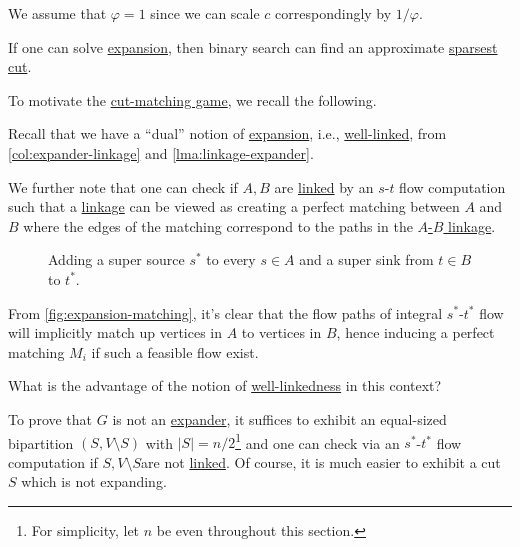 \begin{note}
	We assume that \(\varphi = 1\) since we can scale \(c\) correspondingly by \(1 / \varphi \).
\end{note}

\begin{remark}
	If one can solve \hyperref[prb:expansion]{expansion}, then binary search can find an approximate \hyperref[prb:sparsest-cut]{sparsest cut}.
\end{remark}

To motivate the \hyperref[def:cut-matching-game]{cut-matching game}, we recall the following.

\begin{prev}
	Recall that we have a ``dual'' notion of \hyperref[def:expansion]{expansion}, i.e., \hyperref[def:well-linked]{well-linked}, from \autoref{col:expander-linkage} and \autoref{lma:linkage-expander}.
\end{prev}

We further note that one can check if \(A, B\) are \hyperref[def:linkage]{linked} by an \(s\)-\(t\) flow computation such that a \hyperref[def:linkage]{linkage} can be viewed as creating a perfect matching between \(A\) and \(B\) where the edges of the matching correspond to the paths in the \hyperref[def:linkage]{\(A\)-\(B\) linkage}.

\begin{center}
	\begin{figure}[H]
		\centering
		\caption{Adding a super source \(s^{\ast} \) to every \(s \in A\) and a super sink from \(t \in B\) to \(t^{\ast} \).}
		\label{fig:expansion-matching}
	\end{figure}
\end{center}

From \autoref{fig:expansion-matching}, it's clear that the flow paths of integral \(s^{\ast} \)-\(t^{\ast} \) flow will implicitly match up vertices in \(A\) to vertices in \(B\), hence inducing a perfect matching \(M_i\) if such a feasible flow exist.

\begin{problem*}
	What is the advantage of the notion of \hyperref[def:well-linked]{well-linkedness} in this context?
\end{problem*}
\begin{answer}
	To prove that \(G\) is not an \hyperref[def:expander]{expander}, it suffices to exhibit an equal-sized bipartition \((S, V\setminus S)\) with \(\lvert S \rvert = n / 2\)\footnote{For simplicity, let \(n\) be even throughout this section.} and one can check via an \(s^{\ast} \)-\(t^{\ast} \) flow computation if \(S, V\setminus S\)are not \hyperref[def:linkage]{linked}. Of course, it is much easier to exhibit a cut \(S\) which is not expanding.
\end{answer}


